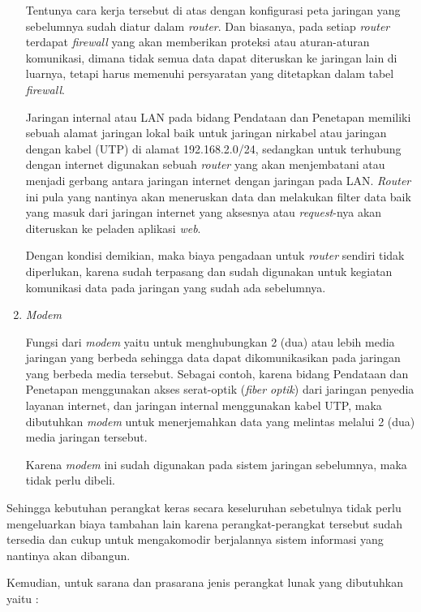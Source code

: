 \documentclass[pdftex,12pt, oneside]{article}
\begin{document}
\begin{enumerate}
Tentunya cara kerja tersebut di atas dengan konfigurasi peta jaringan yang sebelumnya sudah diatur dalam \textit{router}. Dan biasanya, pada setiap \textit{router} terdapat \textit{firewall} yang akan memberikan proteksi atau aturan-aturan komunikasi, dimana tidak semua data dapat diteruskan ke jaringan lain di luarnya, tetapi harus memenuhi persyaratan yang ditetapkan dalam tabel \textit{firewall}.

Jaringan internal atau LAN pada bidang Pendataan dan Penetapan memiliki sebuah alamat jaringan lokal baik untuk jaringan nirkabel atau jaringan dengan kabel (UTP) di alamat 192.168.2.0/24, sedangkan untuk terhubung dengan internet digunakan sebuah \textit{router} yang akan menjembatani atau menjadi gerbang antara jaringan internet dengan jaringan pada LAN. \textit{Router} ini pula yang nantinya akan meneruskan data dan melakukan filter data baik yang masuk dari jaringan internet yang aksesnya atau \textit{request}-nya akan diteruskan ke peladen aplikasi \textit{web}.

Dengan kondisi demikian, maka biaya pengadaan untuk \textit{router} sendiri tidak diperlukan, karena sudah terpasang dan sudah digunakan untuk kegiatan komunikasi data pada jaringan yang sudah ada sebelumnya.
	
	\item \textit{Modem}
	
Fungsi dari \textit{modem} yaitu untuk menghubungkan 2 (dua) atau lebih media jaringan yang berbeda sehingga data dapat dikomunikasikan pada jaringan yang berbeda media tersebut. Sebagai contoh, karena bidang Pendataan dan Penetapan menggunakan akses serat-optik (\textit{fiber optik}) dari jaringan penyedia layanan internet, dan jaringan internal menggunakan kabel UTP, maka dibutuhkan \textit{modem} untuk menerjemahkan data yang melintas melalui 2 (dua) media jaringan tersebut.

Karena \textit{modem} ini sudah digunakan pada sistem jaringan sebelumnya, maka tidak perlu dibeli.
	
\end{enumerate}

Sehingga kebutuhan perangkat keras secara keseluruhan sebetulnya tidak perlu mengeluarkan biaya tambahan lain karena perangkat-perangkat tersebut sudah tersedia dan cukup untuk mengakomodir berjalannya sistem informasi yang nantinya akan dibangun.

Kemudian, untuk sarana dan prasarana jenis perangkat lunak yang dibutuhkan yaitu :
\end{document}
